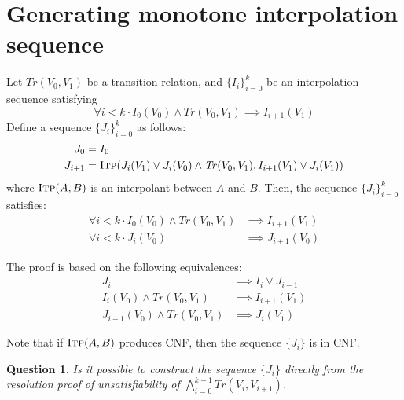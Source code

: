 \documentclass{article}
\newtheorem{question}{Question}
\newcommand{\itp}{\textsc{Itp}}
\newcommand{\Tr}{\mathit{Tr}}
\newcommand{\setof}[1]{\{#1\}}
\begin{document}
\section{Generating monotone interpolation sequence}

Let $\Tr(V_0, V_1)$ be a transition relation, and $\setof{I_i}_{i=0}^k$ be
an interpolation sequence satisfying
\begin{equation}
  \forall i < k \cdot I_0(V_0) \land \Tr(V_0, V_1) \implies I_{i+1}(V_1)
\end{equation}
Define a sequence $\setof{J_i}_{i=0}^{k}$ as follows:
\begin{align}
  J_0 &= I_0\\
  J_{i+1} &= \itp (J_i(V_1) \lor J_i(V_0) \land \Tr(V_0,V_1),
  I_{i+1}(V_1) \lor J_i(V_1))
\end{align}
where $\itp(A,B)$ is an interpolant between $A$ and $B$. Then, the
sequence $\setof{J_i}_{i=0}^k$ satisfies:
\begin{align}
  \forall i < k \cdot I_0(V_0) \land \Tr(V_0, V_1) &\implies
  I_{i+1}(V_1)\\
  \forall i < k \cdot J_i(V_0) &\implies J_{i+1}(V_0)
\end{align}

The proof is based on the following equivalences:
\begin{align}
  J_i &\implies I_i \lor J_{i-1}\\
  I_i(V_0) \land \Tr(V_0,V_1) &\implies I_{i+1}(V_1)\\
  J_{i-1}(V_0) \land \Tr(V_0,V_1) &\implies J_i(V_1)
\end{align}

Note that if $\itp(A,B)$ produces CNF, then the sequence $\setof{J_i}$ is in
CNF.

\begin{question} Is it possible to construct the sequence $\setof{J_i}$
  directly from the resolution proof of unsatisfiability of
  $\bigwedge_{i=0}^{k-1} \Tr(V_i,V_{i+1})$.
\end{question}
\end{document}
